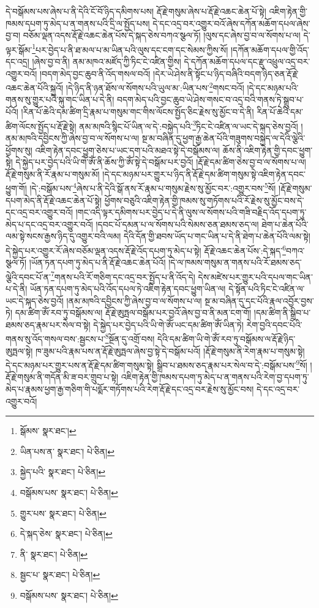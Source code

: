 དེ་བསྒོམས་པས་ཞེས་པ་ནི་དེའི་ངོ་བོ་ཉིད་དམིགས་པས། རྡོ་རྗེ་གསུམ་ཞེས་པ་རྡོ་རྗེ་འཆང་ཆེན་པོ་སྟེ། འཇིག་རྟེན་གྱི་ཁམས་དཔག་ཏུ་མེད་པ་ན་གནས་པའི་དྲི་ལ་སྤྱོད་པས། དེ་དང་འདྲ་བར་འགྱུར་བའོ་ཞེས་དཀོན་མཆོག་དཔལ་ཞེས་བྱ་བ། བཅོམ་ལྡན་འདས་རྡོ་རྗེ་འཆང་ཆེན་པོས་དེ་སྐད་ཅེས་བཀའ་སྩལ་ཏོ། །ལུས་དང་ཞེས་བྱ་བ་ལ་སོགས་པ་ལ། དེ་ལྟར་སྒོམ་\footnote{སྒོམས་  སྣར་ཐང་། }པར་བྱེད་པ་ནི་ཐ་མལ་པ་མ་ཡིན་པའི་ལུས་དང་ངག་དང་སེམས་ཀྱིས་སོ། །དཀོན་མཆོག་དཔལ་གྱི་འོད་དང་འདྲ། །ཞེས་བྱ་བ་ནི། ནམ་མཁའ་མཛོད་ཀྱི་ཏིང་ངེ་འཛིན་གྱིས། དེ་དཀོན་མཆོག་དཔལ་དང་རྫུ་འཕྲུལ་འདྲ་བར་འགྱུར་བའོ། །བདག་མེད་བྱང་ཆུབ་ནི་འོད་གསལ་བའོ། །དེར་ཡེ་ཤེས་ནི་སྟོང་པ་ཉིད་བཞིའི་བདག་ཉིད་ཅན་རྡོ་རྗེ་འཆང་ཆེན་པོའི་སྐུའོ། །དེ་ཉིད་ནི་ཉན་ཐོས་ལ་སོགས་པའི་ཡུལ་མ་:ཡིན་པས་\footnote{ཡིན་པས་ན་  སྣར་ཐང་།  པེ་ཅིན། }གསང་བའོ། །དེ་དང་མཉམ་པའི་གནས་སུ་གྱུར་པའི་སྐུ་གང་ཡིན་པ་དེ་ནི། བདག་མེད་པའི་བྱང་ཆུབ་ཡེ་ཤེས་གསང་བ་འདྲ་བའི་གནས་ཏེ་སྒྲུབ་པ་པོའོ། །རིན་པོ་ཆེའི་དམ་ཚིག་དྲི་རྣམ་པ་གསུམ་གང་གིས་ལོངས་སྤྱོད་ཅིང་རྗེས་སུ་མྱོང་བ་དེ་ནི། རིན་པོ་ཆེའི་དམ་ཚིག་ལོངས་སྤྱོད་པ་རྡོ་རྗེ་སྟེ། ནམ་མཁའི་སྙིང་པོ་ཡིན་ལ་དེ་:བསྐྱེད་པའི་\footnote{སྐྱེད་པའི་  སྣར་ཐང་།  པེ་ཅིན། }ཏིང་ངེ་འཛིན་ལ་ཡང་དེ་སྐད་ཅེས་བྱའོ། །ནམ་མཁའི་དབྱིངས་ཀྱི་ཞེས་བྱ་བ་ལ་སོགས་པ་ལ། སྔ་མ་བཞིན་དུ་ཕྱག་རྒྱ་ཆེན་པོའི་གཟུགས་བསྐྱེད་ལ་དེའི་ལྕེའི་ཕྱོགས་སུ། འཇིག་རྟེན་དབང་ཕྱུག་ཅེས་པ་ཡང་དག་པའི་མཐའ་སྟེ་དེ་བསྒོམས་ལ། ཆོས་ནི་འཇིག་རྟེན་གྱི་དབང་ཕྱུག་སྟེ། དེ་སྐྱེད་པར་བྱེད་པའི་ཡི་གེ་ཨོཾ་ནི་ཆོས་ཀྱི་ཨོཾ་སྟེ་དེ་བསྒོམ་པར་བྱའོ། །རྡོ་རྗེ་དམ་ཚིག་ཅེས་བྱ་བ་ལ་སོགས་པ་ལ། རྡོ་རྗེ་གསུམ་ནི་རོ་རྣམ་པ་གསུམ་མོ། །དེ་དང་མཉམ་པར་གྱུར་པ་ཉིད་ནི་རྡོ་རྗེ་དམ་ཚིག་གསུམ་སྟེ་འཇིག་རྟེན་དབང་ཕྱུག་གོ། །དེ་:བསྒོམ་པས་\footnote{བསྒོམས་པས་  སྣར་ཐང་།  པེ་ཅིན། }ཞེས་པ་ནི་དེའི་སྒོ་ནས་རོ་རྣམ་པ་གསུམ་རྗེས་སུ་མྱོང་བར་:འགྱུར་བས་\footnote{གྱུར་པས་  སྣར་ཐང་།  པེ་ཅིན། }སོ། །རྡོ་རྗེ་གསུམ་དཔག་མེད་ནི་རྡོ་རྗེ་འཆང་ཆེན་པོ་སྟེ། ཕྱོགས་བཅུའི་འཇིག་རྟེན་གྱི་ཁམས་སུ་གཏོགས་པའི་རོ་རྗེས་སུ་མྱོང་བས་དེ་དང་འདྲ་བར་འགྱུར་བའོ། །གང་འདི་ལྟར་དམིགས་པར་བྱེད་པ་དེ་ནི་ལུས་ལ་སོགས་པའི་གཟི་བརྗིད་འོད་དཔག་ཏུ་མེད་པ་དང་འདྲ་བར་འགྱུར་བའོ། །དབང་པོ་དམན་པ་ལ་སོགས་པའི་སེམས་ཅན་ཐམས་ཅད་ལ། ཐེག་པ་ཆེན་པོའི་ལམ་སྟེ་སངས་རྒྱས་ཉིད་དུ་འགྱུར་བའི་ལམ། དེའི་དོན་གྱི་ཐབས་ཡོད་པ་གང་ཡིན་པ་དེ་ནི་ཐེག་པ་ཆེན་པོའི་ལམ་སྟེ། དེ་སྐྱེད་པར་འགྱུར་རོ་ཞེས་བཅོམ་ལྡན་འདས་རྡོ་རྗེ་འོད་དཔག་ཏུ་མེད་པ་སྟེ། རྡོ་རྗེ་འཆང་ཆེན་པོས་:དེ་སྐད་\footnote{དེ་སྐད་ཅེས་  སྣར་ཐང་།  པེ་ཅིན། }བཀའ་སྩལ་ཏོ། །ཡོན་ཏན་དཔག་ཏུ་མེད་པ་ནི་རྡོ་རྗེ་འཆང་ཆེན་པོའོ། །དེ་ལ་ཁམས་གསུམ་ན་གནས་པའི་རོ་ཐམས་ཅད་ལྕེའི་དབང་པོ་ན་\footnote{ནི་  སྣར་ཐང་།  པེ་ཅིན། }གནས་པའི་རོ་གཅིག་དང་འདྲ་བར་སྤྱོད་པ་ནི་འོད་དེ། དེས་མཛེས་པར་གྱུར་པའི་དཔལ་གང་ཡིན་པ་དེ་ནི། ཡོན་ཏན་དཔག་ཏུ་མེད་པའི་འོད་དཔལ་ཏེ་འཇིག་རྟེན་དབང་ཕྱུག་ཡིན་ལ། དེ་སྟོན་པའི་ཏིང་ངེ་འཛིན་ལ་ཡང་དེ་སྐད་ཅེས་བྱའོ། །ནམ་མཁའི་དབྱིངས་ཀྱི་ཞེས་བྱ་བ་ལ་སོགས་པ་ལ། སྔ་མ་བཞིན་དུ་དང་པོའི་རྣལ་འབྱོར་བྱས་ཏེ། དམ་ཚིག་ཨོཾ་རབ་ཏུ་བསྒོམས་ལ། རྡོ་རྗེ་ཨུཏྤལ་བསྒོམ་པར་བྱའོ་ཞེས་བྱ་བ་ནི་མན་ངག་གོ། །དམ་ཚིག་ནི་སྒྲིབ་པ་ཐམས་ཅད་རྣམ་པར་སེལ་བ་སྟེ། དེ་སྐྱེད་པར་བྱེད་པའི་ཡི་གེ་ཨོཾ་ཡང་དམ་ཚིག་ཨོཾ་ཡིན་ཏེ། རེག་བྱའི་དབང་པོའི་གནས་སུ་འོད་གསལ་བས་:སྦྱངས་པ་\footnote{སྦྱང་པ་  སྣར་ཐང་།  པེ་ཅིན། }སྔོན་དུ་འགྲོ་བས། དེའི་དམ་ཚིག་ཡི་གེ་ཨོཾ་རབ་ཏུ་བསྒོམས་ལ་རྡོ་རྗེ་ཉིད་ཨུཏྤལ་སྟེ། ཁ་ཟུམ་པའི་རྣམ་པས་ན་རྡོ་རྗེ་ཨུཏྤལ་ཞེས་བྱ་སྟེ་དེ་བསྒོམ་པའོ། །རྡོ་རྗེ་གསུམ་ནི་རེག་རྣམ་པ་གསུམ་སྟེ། དེ་དང་མཉམ་པར་གྱུར་པས་ན་རྡོ་རྗེ་དམ་ཚིག་གསུམ་སྟེ། སྒྲིབ་པ་ཐམས་ཅད་རྣམ་པར་སེལ་བ་དེ་:བསྒོམ་པས་\footnote{བསྒོམས་པས་  སྣར་ཐང་།  པེ་ཅིན། }སོ། །རྡོ་རྗེ་གསུམ་ནི་གདོན་མི་ཟ་བར་གྲུབ་པ་སྟེ། འཇིག་རྟེན་གྱི་ཁམས་དཔག་ཏུ་མེད་པ་ན་གནས་པའི་རེག་བྱ་དཔག་ཏུ་མེད་པ་རྣམས་ཕྱག་རྒྱ་གཅིག་གི་པདྨོར་གཏོགས་པའི་རེག་རྡོ་རྗེ་དང་འདྲ་བར་རྗེས་སུ་མྱོང་བས། དེ་དང་འདྲ་བར་འགྱུར་བའོ། 
